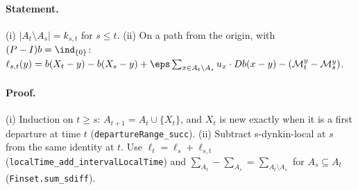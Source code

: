 \paragraph{Statement.} (i) $|A_t\setminus A_s|=k_{s,t}$ for $s\leq t$. (ii) On a path from the origin, with $(P-I)b=\ind_{\{0\}}$:
$\ell_{s,t}(y)=b(X_t-y)-b(X_s-y)+\eps\sum_{x\in A_t\setminus A_s}u_x\cdot Db(x-y)-(\mathcal M^y_t-\mathcal M^y_s)$.
\paragraph{Proof.} (i) Induction on $t\geq s$: $A_{t+1}=A_t\cup\{X_t\}$, and $X_t$ is new exactly when it is a first departure at time $t$
(\texttt{departureRange\_succ}). (ii) Subtract s-dynkin-local at $s$ from the same identity at $t$. Use
$\ell_t=\ell_s+\ell_{s,t}$ (\texttt{localTime\_add\_intervalLocalTime}) and $\sum_{A_t}-\sum_{A_s}=\sum_{A_t\setminus A_s}$ for $A_s\subseteq A_t$
(\texttt{Finset.sum\_sdiff}).

